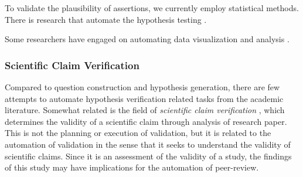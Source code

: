 


To validate the plausibility of assertions, we currently employ statistical methods. There is research that automate the hypothesis testing \cite{gil2016automated}. 

Some researchers have engaged on automating data visualization and analysis \cite{bavishi2021vizsmith,bavishi2022tools}.

\subsubsection{Scientific Claim Verification}

Compared to question construction and hypothesis generation, there are few attempts to automate hypothesis verification related tasks from the academic literature. Somewhat related is the field of \textit{scientific claim verification} \cite{li2019scientific,wadden2020fact,wadden2022scifact,wadden2022multivers}, which determines the validity of a scientific claim through analysis of research paper. This is not the planning or execution of validation, but it is related to the automation of validation in the sense that it seeks to understand the validity of scientific claims. Since it is an assessment of the validity of a study, the findings of this study may have implications for the automation of peer-review.

